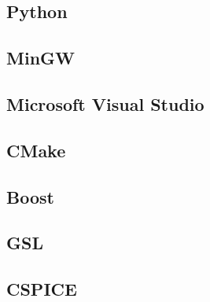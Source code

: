 \documentclass[11pt]{article}
\begin{document}


\subsection{Python}
\label{sec:python}



\subsection{MinGW}
\label{sec:mingw}



\subsection{Microsoft Visual Studio}
\label{sec:visual_studio}



\subsection{CMake}
\label{sec:cmake}



\subsection{Boost}
\label{sec:boost}



\subsection{GSL}
\label{sec:gsl}



\subsection{CSPICE}
\label{sec:cspice}
\end{document}
